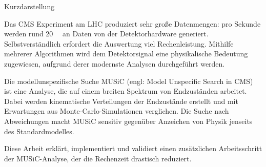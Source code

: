 
\vspace*{5mm}
\vspace*{\fill}
{Kurzdarstellung}
\chapterheadendvskip

Das CMS Experiment am LHC produziert sehr große Datenmengen: pro Sekunde werden rund \SI{20}{\tera\byte} an Daten von der Detektorhardware generiert. Selbstverständlich erfordert die Auswertung viel Rechenleistung. Mithilfe mehrerer Algorithmen wird dem Detektorsignal eine physikalische Bedeutung zugewiesen, aufgrund derer modernste Analysen durchgeführt werden.

Die modellunspezifische Suche MUSiC (engl: Model Unspecific Search in CMS) ist eine Analyse, die auf einem breiten Spektrum von Endzuständen arbeitet. Dabei werden kinematische Verteilungen der Endzustände erstellt und mit Erwartungen aus Monte-Carlo-Simulationen verglichen. Die Suche nach Abweichungen macht MUSiC sensitiv gegenüber Anzeichen von Physik jenseits des Standardmodelles.

Diese Arbeit erklärt, implementiert und validiert einen zusätzlichen Arbeitsschritt der MUSiC-Analyse, der die Rechenzeit drastisch reduziert.